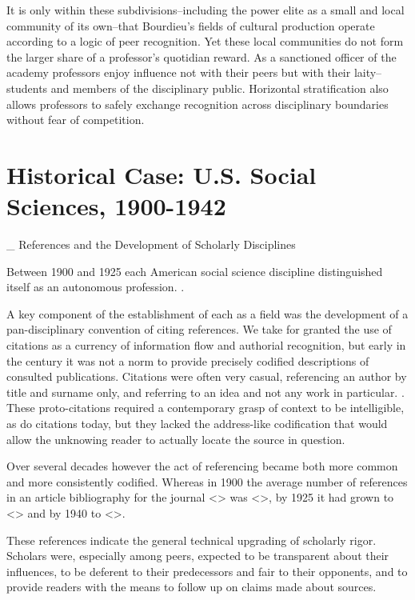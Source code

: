 \documentclass [PhD] {uclathes}
\begin{document}
It is only within these subdivisions--including the power elite as a
small and local community of its own--that Bourdieu's fields of cultural
production operate according to a logic of peer recognition. Yet these
local communities do not form the larger share of a professor's
quotidian reward. As a sanctioned officer of the academy professors
enjoy influence not with their peers but with their laity--students and
members of the disciplinary public. Horizontal stratification also
allows professors to safely exchange recognition across disciplinary
boundaries without fear of competition.

\section{Historical Case: U.S. Social Sciences,
1900-1942}\label{historical-case-u.s.-social-sciences-1900-1942}

\_ References and the Development of Scholarly Disciplines

Between 1900 and 1925 each American social science discipline
distinguished itself as an autonomous profession. .

A key component of the establishment of each as a field was the
development of a pan-disciplinary convention of citing references. We
take for granted the use of citations as a currency of information flow
and authorial recognition, but early in the century it was not a norm to
provide precisely codified descriptions of consulted publications.
Citations were often very casual, referencing an author by title and
surname only, and referring to an idea and not any work in particular. .
These proto-citations required a contemporary grasp of context to be
intelligible, as do citations today, but they lacked the address-like
codification that would allow the unknowing reader to actually locate
the source in question.

Over several decades however the act of referencing became both more
common and more consistently codified. Whereas in 1900 the average
number of references in an article bibliography for the journal
\textless{}\textgreater{} was \textless{}\textgreater{}, by 1925 it had
grown to \textless{}\textgreater{} and by 1940 to
\textless{}\textgreater{}.

These references indicate the general technical upgrading of scholarly
rigor. Scholars were, especially among peers, expected to be transparent
about their influences, to be deferent to their predecessors and fair to
their opponents, and to provide readers with the means to follow up on
claims made about sources.
\end{document}

